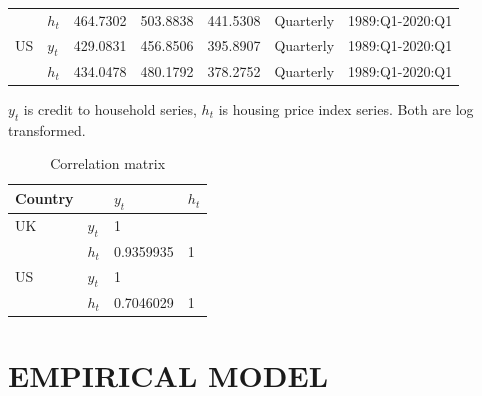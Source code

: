 \documentclass[12pt]{article}
\begin{document}
\begin{outline}[enumerate]
\begin{table}[]
\begin{threeparttable}
\begin{tabular}{@{}llSSSll@{}}
					& $h_t$ & 464.7302 & 503.8838 & 441.5308 & Quarterly & 1989:Q1-2020:Q1\\[2pt] 
					
					US & $y_t$ & 429.0831 & 456.8506 & 395.8907 & Quarterly & 1989:Q1-2020:Q1\\[2pt] 
					
					& $h_t$ & 434.0478 & 480.1792 & 378.2752 & Quarterly & 1989:Q1-2020:Q1\\[2pt] 
					
					\bottomrule
				\end{tabular}
				\begin{tablenotes}
					\small
					\item $y_t$ is credit to household series, $h_t$ is housing price index series. Both are log transformed. \\
				\end{tablenotes}
			\end{threeparttable}
		\end{table}
		
		
		\begin{table}[]
			\centering
			\begin{threeparttable}
				\caption {\label{tab:table2} Correlation matrix}
				\begin{tabular}{@{}llll@{}}
					\toprule
					Country & & $y_t$ & $h_t$ \\
					\midrule
					UK & $y_t$ & 1 &  \\[2pt] 
					
					& $h_t$ & 0.9359935 & 1 \\[2pt] 
					\midrule
					US & $y_t$ & 1 &  \\[2pt] 
					
					& $h_t$ & 0.7046029 & 1 \\[2pt] 
					
					\bottomrule
				\end{tabular}
			\end{threeparttable}
		\end{table}
		
		
		\section {EMPIRICAL MODEL}

\end{outline}
\end{document}
